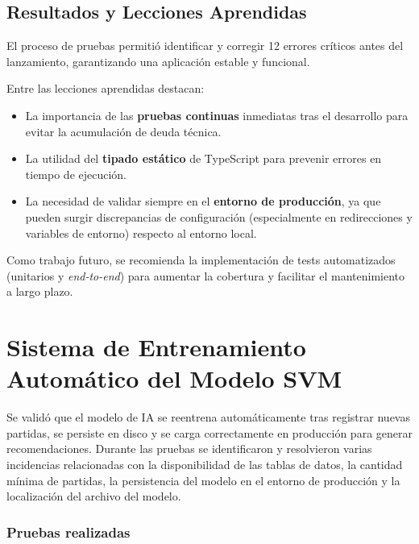 \subsection{Resultados y Lecciones Aprendidas}

El proceso de pruebas permitió identificar y corregir 12 errores críticos antes del lanzamiento, garantizando una aplicación estable y funcional.

Entre las lecciones aprendidas destacan:
\begin{itemize}
    \item La importancia de las \textbf{pruebas continuas} inmediatas tras el desarrollo para evitar la acumulación de deuda técnica.
    \item La utilidad del \textbf{tipado estático} de TypeScript para prevenir errores en tiempo de ejecución.
    \item La necesidad de validar siempre en el \textbf{entorno de producción}, ya que pueden surgir discrepancias de configuración (especialmente en redirecciones y variables de entorno) respecto al entorno local.
\end{itemize}

Como trabajo futuro, se recomienda la implementación de tests automatizados (unitarios y \textit{end-to-end}) para aumentar la cobertura y facilitar el mantenimiento a largo plazo.

\section{Sistema de Entrenamiento Automático del Modelo SVM}
\label{sec:svm}

Se validó que el modelo de IA se reentrena automáticamente tras registrar nuevas partidas, se persiste en disco y se carga correctamente en producción para generar recomendaciones. Durante las pruebas se identificaron y resolvieron varias incidencias relacionadas con la disponibilidad de las tablas de datos, la cantidad mínima de partidas, la persistencia del modelo en el entorno de producción y la localización del archivo del modelo.

\subsubsection*{Pruebas realizadas}

